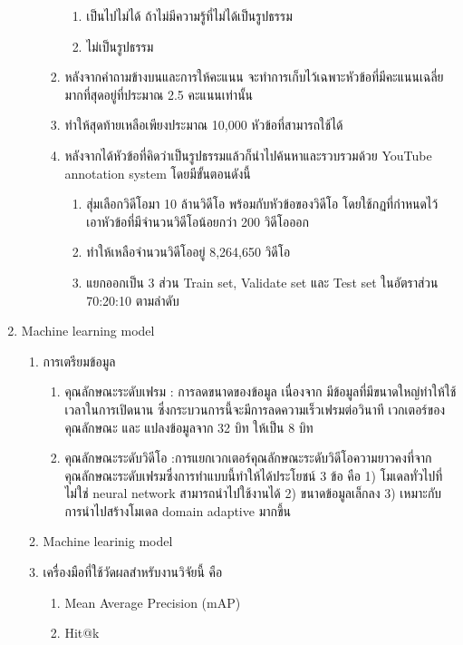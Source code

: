 \begin{enumerate}
\begin{enumerate}
\begin{enumerate}
\begin{enumerate}
				\item เป็นไปไม่ได้ ถ้าไม่มีความรู้ที่ไม่ได้เป็นรูปธรรม
				\item ไม่เป็นรูปธรรม
			\end{enumerate}
			\item หลังจากคำถามข้างบนและการให้คะแนน จะทำการเก็บไว้เฉพาะหัวข้อที่มีคะแนนเฉลี่ยมากที่สุดอยู่ที่ประมาณ 2.5 คะแนนเท่านั้น
			\item ทำให้สุดท้ายเหลือเพียงประมาณ 10,000 หัวข้อที่สามารถใช้ได้
			\item หลังจากได้หัวข้อที่คิดว่าเป็นรูปธรรมแล้วก็นำไปค้นหาและรวบรวมด้วย YouTube annotation system โดยมีขั้นตอนดังนี้										\begin{enumerate}
				\setlength\itemsep{-0.25em}
				\item สุ่มเลือกวิดีโอมา 10 ล้านวิดีโอ พร้อมกับหัวข้อของวิดีโอ โดยใช้กฏที่กำหนดไว้ เอาหัวข้อที่มีจำนวนวิดีโอน้อยกว่า 200 วิดีโอออก
				\item ทำให้เหลือจำนวนวิดีโออยู่ 8,264,650 วิดีโอ
				\item แยกออกเป็น 3 ส่วน Train set, Validate set และ Test set ในอัตราส่วน 70:20:10 ตามลำดับ
			\end{enumerate}
		\end{enumerate}
	\end{enumerate}
	\item {Machine learning model}
	\begin{enumerate}
		\setlength\itemsep{-0.25em}
		\item การเตรียมข้อมูล
			\begin{enumerate}  
				\item คุณลักษณะระดับเฟรม : การลดขนาดของข้อมูล เนื่องจาก มีข้อมูลที่มีขนาดใหญ่ทำให้ใช้เวลาในการเปิดนาน ซึ่งกระบวนการนี้จะมีการลดความเร็วเฟรมต่อวินาที เวกเตอร์ของคุณลักษณะ และ แปลงข้อมูลจาก 32 บิท ให้เป็น 8 บิท
				\item คุณลักษณะระดับวิดีโอ :การแยกเวกเตอร์คุณลักษณะระดับวิดีโอความยาวคงที่จากคุณลักษณะระดับเฟรมซึ่งการทำแบบนี้ทำให้ได้ประโยชน์ 3 ข้อ คือ 1) โมเดลทั่วไปที่ไม่ใช่ neural network สามารถนำไปใช้งานได้  2) ขนาดข้อมูลเล็กลง  3) เหมาะกับการนำไปสร้างโมเดล domain adaptive มากขึ้น
			\end{enumerate}	
		\item Machine learinig model %
		\item เครื่องมือที่ใช้วัดผลสำหรับงานวิจัยนี้ คือ
		\begin{enumerate}
			\setlength\itemsep{-0.25em}
			\item Mean Average Precision (mAP)
			\item Hit@k

\end{enumerate}
\end{enumerate}
\end{enumerate}

